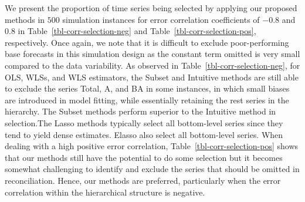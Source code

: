 \documentclass[11pt,a4paper,]{article}
\begin{document}
We present the proportion of time series being selected by applying our
proposed methods in \(500\) simulation instances for error correlation
coefficients of \(-0.8\) and \(0.8\) in
Table~\ref{tbl-corr-selection-neg} and
Table~\ref{tbl-corr-selection-pos}, respectively. Once again, we note
that it is difficult to exclude poor-performing base forecasts in this
simulation design as the constant term omitted is very small compared to
the data variability. As observed in Table~\ref{tbl-corr-selection-neg},
for OLS, WLSs, and WLS estimators, the Subset and Intuitive methods are
still able to exclude the series Total, A, and BA in some instances, in
which small biases are introduced in model fitting, while essentially
retaining the rest series in the hierarchy. The Subset methods perform
superior to the Intuitive method in selection.The Lasso methods
typically select all bottom-level series since they tend to yield dense
estimates. Elasso also select all bottom-level series. When dealing with
a high positive error correlation, Table~\ref{tbl-corr-selection-pos}
shows that our methods still have the potential to do some selection but
it becomes somewhat challenging to identify and exclude the series that
should be omitted in reconciliation. Hence, our methods are preferred,
particularly when the error correlation within the hierarchical
structure is negative.
\end{document}

